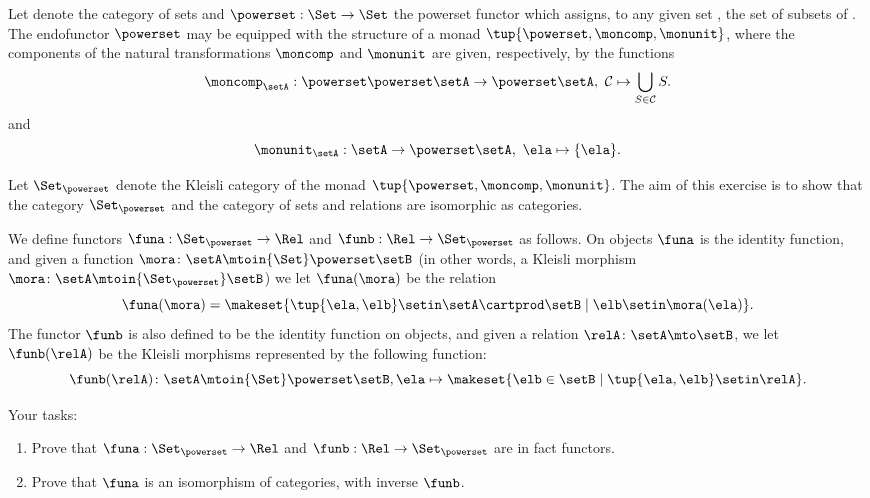 \begin{gradedexercise}
    \label{ex:HwkRelKleisli}

    Let \Set denote the category of sets and $\powerset : \Set \to \Set$ the powerset functor which assigns, to any given set \setA, the set of subsets of \setA.
    The endofunctor $\powerset$ may be equipped with the structure of a monad $\tup{\powerset, \moncomp, \monunit}$, where the components of the natural transformations $\moncomp$ and $\monunit$ are given, respectively, by the functions
    \begin{equation}
        \moncomp_{\setA} : \powerset \powerset \setA \to \powerset \setA, \ \mathcal{C} \mapsto \bigcup_{S \in \mathcal{C}} S.
    \end{equation}
    and
    \begin{equation}
        \monunit_{\setA} : \setA \to \powerset \setA, \ \ela \mapsto \{ \ela \}.
    \end{equation}

    Let $\Set_{\powerset}$ denote the Kleisli category of the monad $\tup{\powerset, \moncomp, \monunit}$.
    The aim of this exercise is to show that the category $\Set_{\powerset}$ and the category \Rel of sets and relations are isomorphic as categories.

    We define functors $\funa: \Set_{\powerset} \to \Rel$ and $\funb: \Rel \to \Set_{\powerset}$ as follows.
    On objects $\funa$ is the identity function, and given a function $\mora \colon \setA \mtoin{\Set} \powerset \setB$ (in other words, a Kleisli morphism $\mora \colon \setA \mtoin{\Set_{\powerset}} \setB$) we let $\funa(\mora)$ be the relation
    \begin{equation}
        \funa(\mora) = \makeset{\tup{\ela, \elb} \setin \setA \cartprod \setB \mid \elb \setin \mora(\ela)}.
    \end{equation}
    The functor $\funb$ is also defined to be the identity function on objects, and given a relation $\relA \colon \setA \mto \setB$, we let $\funb(\relA)$ be the Kleisli morphisms represented by the following function:
    \begin{equation}
        \funb(\relA)\colon \setA \mtoin{\Set} \powerset \setB, \ela \mapsto \makeset{\elb \in \setB \mid \tup{\ela, \elb} \setin \relA}.
    \end{equation}

    Your tasks:
    \begin{enumerate}
        \item Prove that $\funa: \Set_{\powerset} \to \Rel$ and $\funb: \Rel \to \Set_{\powerset}$ are in fact functors.
        \item Prove that $\funa$ is an isomorphism of categories, with inverse $\funb$.
    \end{enumerate}
\end{gradedexercise}

